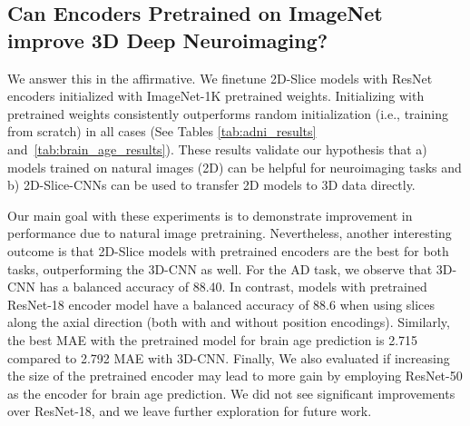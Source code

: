 \subsection{Can Encoders Pretrained on ImageNet improve 3D Deep Neuroimaging?}
We answer this in the affirmative. We finetune 2D-Slice models with ResNet encoders initialized with ImageNet-1K pretrained weights. Initializing with pretrained weights consistently outperforms random initialization (i.e., training from scratch) in all cases (See Tables \ref{tab:adni_results} and~\ref{tab:brain_age_results}). These results validate our hypothesis that a) models trained on natural images (2D) can be helpful for neuroimaging tasks and b) 2D-Slice-CNNs can be used to transfer 2D models to 3D data directly.

Our main goal with these experiments is to demonstrate improvement in performance due to natural image pretraining. Nevertheless, another interesting outcome is that 2D-Slice models with pretrained encoders are the best for both tasks, outperforming the 3D-CNN as well. For the AD  task, we observe that 3D-CNN has a balanced accuracy of 88.40. In contrast, models with pretrained ResNet-18 encoder model have a balanced accuracy of 88.6 when using slices along the axial direction (both with and without position encodings). Similarly, the best MAE with the pretrained model for brain age prediction is 2.715 compared to 2.792 MAE with 3D-CNN. Finally, We also evaluated if increasing the size of the pretrained encoder may lead to more gain by employing ResNet-50 as the encoder for brain age prediction.
We did not see significant improvements over ResNet-18, and we leave further exploration for future work.


